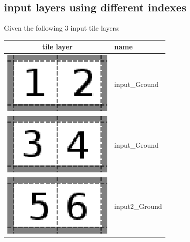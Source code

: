 \subsection{input layers using different indexes}
Given the following 3 input tile layers:
\begin{table}[h!]
        \begin{tabular}{|c|l|}
        \hline
		tile layer & name \\
        \hline
        \hline
		\includegraphics[scale=1]{Example/AbstractInput/12.eps} & input\_Ground \\
		\hline
		\includegraphics[scale=1]{Example/AbstractInput/34.eps} & input\_Ground\\
		\hline
		\includegraphics[scale=1]{Example/AbstractInput/56.eps} & input2\_Ground\\
		\hline
		\end{tabular}
\end{table}

